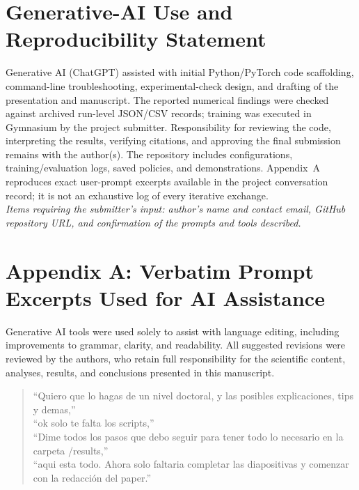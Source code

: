 \documentclass[conference,10pt]{IEEEtran}
\begin{document}
\section*{Generative-AI Use and Reproducibility Statement}
Generative AI (ChatGPT) assisted with initial Python/PyTorch code scaffolding, command-line troubleshooting, experimental-check design, and drafting of the presentation and manuscript. The reported numerical findings were checked against archived run-level JSON/CSV records; training was executed in Gymnasium by the project submitter. Responsibility for reviewing the code, interpreting the results, verifying citations, and approving the final submission remains with the author(s). The repository includes configurations, training/evaluation logs, saved policies, and demonstrations. Appendix~A reproduces exact user-prompt excerpts available in the project conversation record; it is not an exhaustive log of every iterative exchange.\\
\textit{Items requiring the submitter's input: author's name and contact email, GitHub repository URL, and confirmation of the prompts and tools described.}


\section*{Appendix A: Verbatim Prompt Excerpts Used for AI Assistance}
Generative AI tools were used solely to assist with language editing, including improvements to grammar, clarity, and readability. All suggested revisions were reviewed by the authors, who retain full responsibility for the scientific content, analyses, results, and conclusions presented in this manuscript.

\begin{quote}\footnotesize
``Quiero que lo hagas de un nivel doctoral, y las posibles explicaciones, tips y demas,''\\[2pt]
``ok solo te falta los scripts,''\\[2pt]
``Dime todos los pasos que debo seguir para tener todo lo necesario en la carpeta /results,''\\[2pt]
``aqui esta todo. Ahora solo faltaria completar las diapositivas y comenzar con la redacci\'on del paper.''
\end{quote}
\end{document}
